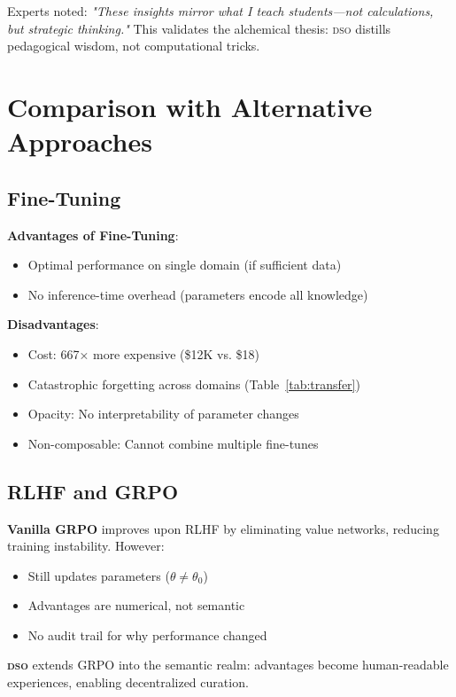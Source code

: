 \documentclass[11pt,letterpaper]{article}
\newcommand{\DSO}{\textsc{dso}}
\begin{document}
Experts noted: \textit{"These insights mirror what I teach students—not calculations, but strategic thinking."} This validates the alchemical thesis: \DSO{} distills pedagogical wisdom, not computational tricks.

\section{Comparison with Alternative Approaches}

\subsection{Fine-Tuning}

\textbf{Advantages of Fine-Tuning}:
\begin{itemize}
    \item Optimal performance on single domain (if sufficient data)
    \item No inference-time overhead (parameters encode all knowledge)
\end{itemize}

\textbf{Disadvantages}:
\begin{itemize}
    \item Cost: 667× more expensive (\$12K vs. \$18)
    \item Catastrophic forgetting across domains (Table~\ref{tab:transfer})
    \item Opacity: No interpretability of parameter changes
    \item Non-composable: Cannot combine multiple fine-tunes
\end{itemize}

\subsection{RLHF and GRPO}

\textbf{Vanilla GRPO} improves upon RLHF by eliminating value networks, reducing training instability. However:

\begin{itemize}
    \item Still updates parameters ($\theta \neq \theta_0$)
    \item Advantages are numerical, not semantic
    \item No audit trail for why performance changed
\end{itemize}

\textbf{\DSO{}} extends GRPO into the semantic realm: advantages become human-readable experiences, enabling decentralized curation.
\end{document}
